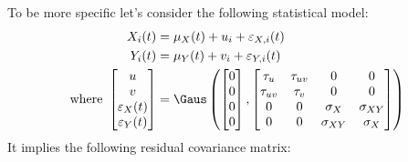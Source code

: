 \documentclass[12pt]{article}
\begin{document}
To be more specific let's consider the following statistical model:
\begin{align*}
X_i(t) &= \mu_{X}(t) + u_i + \varepsilon_{X,i}(t) \\
Y_i(t) &= \mu_{Y}(t) + v_i + \varepsilon_{Y,i}(t) \\
\text{where } \begin{bmatrix}u \\ v \\ \varepsilon_X(t) \\ \varepsilon_Y(t) \end{bmatrix}
&= \Gaus\left(\begin{bmatrix}0 \\ 0 \\ 0 \\ 0 \end{bmatrix},
\begin{bmatrix}
\tau_u & \tau_{uv} & 0 & 0 \\ \tau_{uv} & \tau_v & 0 & 0 \\ 
 0 & 0 & \sigma_X & \sigma_{XY} \\ 0 & 0 & \sigma_{XY} & \sigma_X \\ 
\end{bmatrix} \right)
\end{align*}
It implies the following residual covariance matrix:
\end{document}
